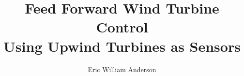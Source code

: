 \documentclass[12pt,draftcls]{ucdavisthesis}
\title          {Feed Forward Wind Turbine Control \\
				Using Upwind Turbines as Sensors}
\author         {Eric William Anderson}
\begin{document}
\renewcommand{\bibfont}{\singlespacing}

%

\makeintropages %












\appendix %










\label{Bibliography}




\end{document}
